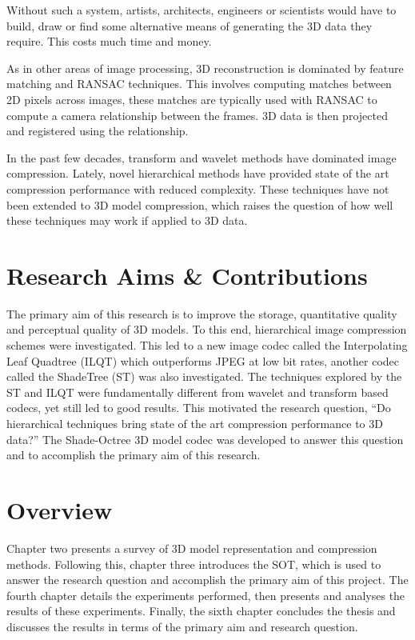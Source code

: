 Without such a system, artists, architects, engineers or scientists would have to build, draw or find some alternative means of generating the 3D data they require. This costs much time and money.

As in other areas of image processing, 3D reconstruction is dominated by feature matching and RANSAC techniques. This involves computing matches between 2D pixels across images, these matches are typically used with RANSAC to compute a camera relationship between the frames. 3D data is then projected and registered using the relationship. 

In the past few decades, transform and wavelet methods have dominated image compression. Lately, novel hierarchical methods have provided state of the art compression performance with reduced complexity. These techniques have not been extended to 3D model compression, which raises the question of how well these techniques may work if applied to 3D data. 

\section{Research Aims \& Contributions}

The primary aim of this research is to improve the storage, quantitative quality and perceptual quality of 3D models. To this end, hierarchical image compression schemes were investigated. This led to a new image codec called the Interpolating Leaf Quadtree (ILQT) \cite{Lincoln13Interpolating} which outperforms JPEG at low bit rates, another codec called the ShadeTree (ST) was also investigated. The techniques explored by the ST and ILQT were fundamentally different from wavelet and transform based codecs, yet still led to good results. This motivated the research question, ``Do hierarchical techniques bring state of the art compression performance to 3D data?'' The Shade-Octree 3D model codec was developed to answer this question and to accomplish the primary aim of this research. 

\section{Overview}

Chapter two presents a survey of 3D model representation and compression methods. Following this, chapter three introduces the SOT, which is used to answer the research question and accomplish the primary aim of this project. The fourth chapter details the experiments performed, then presents and analyses the results of these experiments. Finally, the sixth chapter concludes the thesis and discusses the results in terms of the primary aim and research question. 


